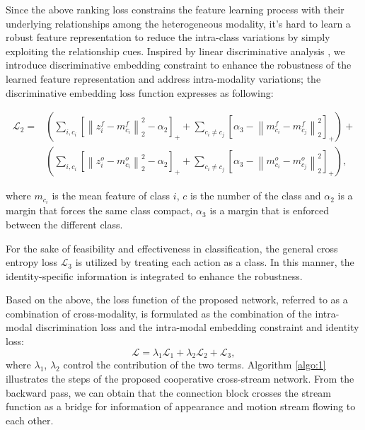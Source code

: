 \documentclass[conference,compsoc]{IEEEtran}
\begin{document}
Since the above ranking loss constrains the feature learning process with their underlying relationships among the heterogeneous modality, it's hard to learn a robust feature representation to reduce the intra-class variations by simply exploiting the relationship cues. Inspired by linear discriminative analysis \cite{Belhumeur2002Eigenfaces}, we introduce discriminative embedding constraint to enhance the robustness of the learned feature representation and address intra-modality variations; the discriminative embedding loss function expresses as following:
\begin{small}
\begin{equation}
\begin{split}
    \mathcal{L} _ { 2 } \!= & \!\left( \sum _ { i , c_{i} } \left[ \left\| z _ { i }^{f} \!-\! m _ { c_{i} }^{f} \right\| _ { 2 } ^ { 2 } \!-\! \alpha _ { 2 } \right] _ { + } \!+ \!\sum _ { c _ { i } \neq c _ { j } } \left[ \alpha _ { 3 } \!-\! \left\| m _ { c _ { i } }^{f} \!-\! m _ { c _ { j } }^{f} \right\| _ { 2 } ^ { 2 } \right] _ { + } \right) \!+\! \\    
    & \left(\sum _ { i , c_{i} } \left[ \left\| z _ { i }^{o} \!-\! m _ { c_{i} }^{o} \right\| _ { 2 } ^ { 2 } \!-\! \alpha _ { 2 } \right] _ { + } \!+\! \sum _ { c _ { i } \neq c _ { j } } \left[ \alpha _ { 3 } \!-\! \left\| m _ { c _ { i } }^{o} \!-\! m _ { c _ { j } }^{o} \right\| _ { 2 } ^ { 2 } \right] _ { + } \right),
\end{split}
\end{equation}
\end{small}
where $m _ { c _ { i } }$ is the mean feature of class $i$, $c$ is the number of the class and $\alpha_{2}$ is a margin that forces the same class compact, $\alpha_{3}$ is a margin that is enforced between the different class.

For the sake of feasibility and effectiveness in classification, the general cross entropy loss $\mathcal{L}_{3}$ is utilized by treating each action as a class. In this manner, the identity-specific information is integrated to enhance the robustness.

Based on the above, the loss function of the proposed network, referred to as a combination of cross-modality, is formulated as the combination of the intra-modal discrimination loss and the intra-modal embedding constraint  and identity loss:
\begin{equation}
    \mathcal{L} = \lambda_{1} \mathcal{L}_{1} + \lambda_{2} \mathcal{L}_{2} + \mathcal{L}_{3},
\end{equation}
where $\lambda_{1}$, $\lambda_{2}$ control the contribution of the two terms. Algorithm \ref{algo:1} illustrates the steps of the proposed cooperative cross-stream network. From the backward pass, we can obtain that the connection block crosses the stream function as a bridge for information of appearance and motion stream flowing to each other.
\end{document}
